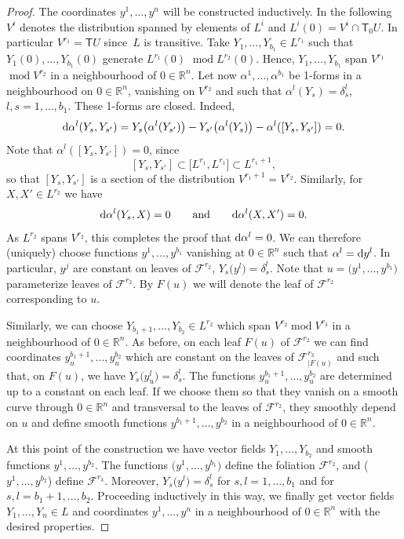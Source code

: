 \begin{proof} The coordinates $y^1,\ldots, y^n$ will be constructed inductively. In the following $V^i$ denotes the distribution spanned by elements of $L^i$ and $L^i(0)=V^i\cap{\mathsf T}_0 U$. In particular $V^{r_1}={\mathsf T} U$ since~$L$ is transitive.
Take $Y_1,\dots,Y_{b_1}\in L^{r_1}$ such that $Y_1(0),\dots,Y_{b_1}(0)$ generate $L^{r_1}(0)$ $\operatorname{mod} L^{r_2}(0)$. Hence, $Y_1,\dots,Y_{b_1}$ span $V^{r_1}$ $\operatorname{mod} V^{r_2}$ in a neighbourhood of $0\in{\mathbb R}^n$.
Let now $\alpha^1,\dots,\alpha^{b_1}$ be 1-forms in a neighbourhood on $0\in{\mathbb R}^n$, vanishing on $V^{r_2}$ and such that
$\alpha^l(Y_s)=\delta^l_s$, $l,s=1,\dots, b_1$. These 1-forms are closed. Indeed,
\[ {\rm d}\alpha^l(Y_s,Y_{s'})=Y_s\big(\alpha^l(Y_{s'})\big)- Y_{s'}\big(\alpha^l(Y_{s})\big)-\alpha^l([Y_s,Y_{s'}])=0 .\] Note that $\alpha^l([Y_s,Y_{s'}])=0$, since
\[ [Y_s,Y_{s'}]\subset \big[L^{r_1},L^{r_1}\big]\subset L^{r_1+1},\]
so that $[Y_s,Y_{s'}]$ is a section of the distribution $V^{r_1+1}=V^{r_2}$.
Similarly, for $X,X'\in L^{r_2}$ we have
\[ {\rm d}\alpha^l(Y_s,X)=0 \qquad\text{and}\qquad {\rm d}\alpha^l(X,X')=0 .\]
As $L^{r_2}$ spans $V^{r_2}$, this completes the proof that ${\rm d}\alpha^l=0$.
We can therefore (uniquely) choose functions $y^1,\dots,y^{b_1}$ vanishing at $0\in{\mathbb R}^n$ such that $\alpha^l={\rm d} y^l$. In particular, $y^j$ are constant on leaves of ${\mathcal F}^{r_2}$, $Y_s\big(y^l\big)=\delta^l_s$. Note that $u=\big(y^1,\ldots, y^{b_1}\big)$ parameterize leaves of ${\mathcal F}^{r_2}$. By $F(u)$ we will denote the leaf of ${\mathcal F}^{r_2}$ corresponding to $u$.

Similarly, we can choose $Y_{b_1+1},\dots,Y_{b_2}\in L^{r_2}$ which span $V^{r_2} \operatorname{mod} V^{r_3}$ in a neighbourhood of $0\in{\mathbb R}^n$. As before, on each leaf $F(u)$ of ${\mathcal F}^{r_2}$ we can find coordinates $y^{b_1+1}_u,\dots,y_u^{b_2}$ which are constant on the leaves of ${\mathcal F}^{r_3}_{|F(u)}$ and such that, on $F(u)$, we have $Y_s\big(y^l_u\big)=\delta^l_s$. The functions $y^{b_1+1}_u,\dots,y_u^{b_2}$ are determined up to a constant on each leaf. If we choose them so that they vanish on a smooth curve through $0\in{\mathbb R}^n$ and transversal to the leaves of ${\mathcal F}^{r_2}$, they smoothly depend on $u$ and define smooth functions $y^{b_1+1},\dots,y^{b_2}$ in a neighbourhood of $0\in{\mathbb R}^n$.

At this point of the construction we have vector fields $Y_1,\dots,Y_{b_2}$ and smooth functions $y^1,\dots,y^{b_2}$. The functions $\big(y^1,\dots,y^{b_1}\big)$ define the foliation ${\mathcal F}^{r_2}$, and ($y^1,\dots,y^{b_2}$) define ${\mathcal F}^{r_3}$. Moreover, $Y_s\big(y^l\big)=\delta^l_s$ for $s,l=1,\dots,b_1$ and for $s,l=b_1+1,\dots,b_2$.
Proceeding inductively in this way, we finally get vector fields $Y_1,\dots,Y_n\in L$ and coordinates $y^1,\dots,y^n$ in a neighbourhood of $0\in{\mathbb R}^n$ with the desired properties.


\end{proof}

